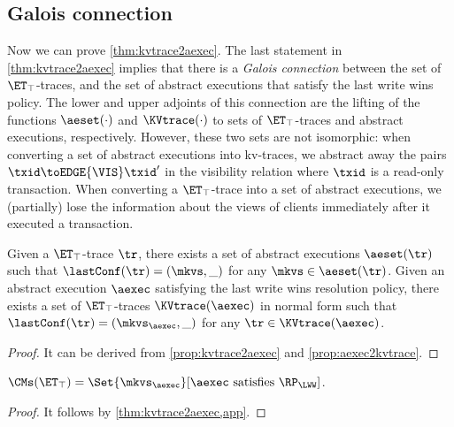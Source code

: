 \subsection{Galois connection}
\label{sec:galois-kv-aexec}
Now we can prove \cref{thm:kvtrace2aexec}.
The last statement in \cref{thm:kvtrace2aexec} implies that there is a \emph{Galois connection}
between the set of $\ET_{\top}$-traces, and the set of abstract executions that satisfy the 
last write wins policy. The lower and upper adjoints of this connection are the 
lifting of the functions $\aeset(\cdot)$ and $\KVtrace(\cdot)$ to sets of $\ET_{\top}$-traces 
and abstract executions, respectively. However, these two sets are not isomorphic: 
when converting a set of abstract executions into kv-traces, we abstract away the 
pairs $\txid \toEDGE{\VIS} \txid'$ in the visibility relation where $\txid$ is a read-only transaction.
When converting a $\ET_{\top}$-trace into a set of abstract executions, 
we (partially) lose the information about the views of clients immediately after it executed a transaction.

\begin{theorem}
\label{thm:kvtrace2aexec.app}
Given a $\ET_{\top}$-trace $\tr$, there exists a set of abstract executions $\aeset({\tr})$ 
such that $\lastConf(\tr) = (\mkvs, \_)$ for any $\mkvs \in \aeset(\tr)$.
Given an abstract execution $\aexec$ satisfying the last write wins resolution policy,
there exists a set of $\ET_{\top}$-traces $\KVtrace({\aexec})$ in normal form
such that $\lastConf(\tr) = (\mkvs_{\aexec}, \_)$ for any $\tr \in \KVtrace({\aexec})$.
\end{theorem}
\begin{proof}
    It can be derived from \cref{prop:kvtrace2aexec} and \cref{prop:aexec2kvtrace}.
\end{proof}

\begin{corollary} 
\label{cor:kvtrace2aexec}
$\CMs(\ET_{\top}) = \Set{\mkvs_{\aexec} }[ \aexec \text{ satisfies } \RP_{\LWW}]$.
\end{corollary}
\begin{proof}
    It follows by \cref{thm:kvtrace2aexec,app}.
\end{proof}

